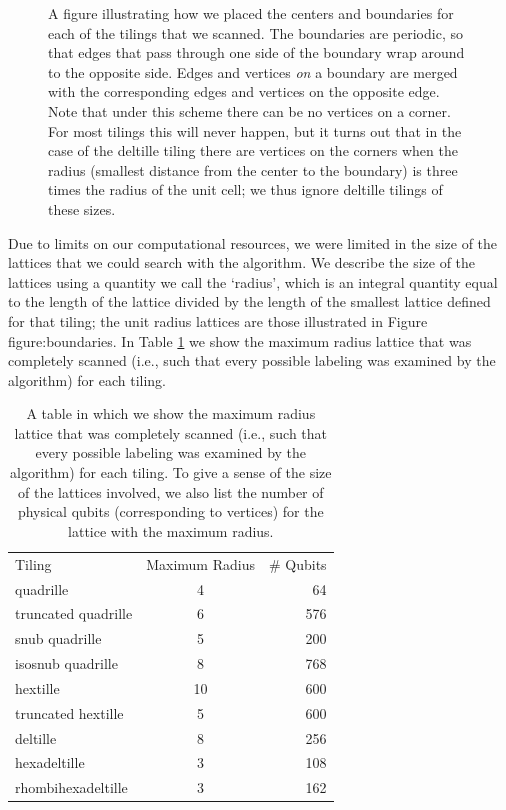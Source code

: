 \documentclass[12pt]{amsbook}
\theoremstyle{plain}
\theoremstyle{definition}
\theoremstyle{remark}
\begin{document}
\begin{figure}
\caption{
\label{figure:boundaries}
A figure illustrating how we placed the centers and boundaries for each of the tilings that we scanned.  The boundaries are periodic, so that edges that pass through one side of the boundary wrap around to the opposite side.  Edges and vertices \emph{on} a boundary are merged with the corresponding edges and vertices on the opposite edge.
Note that under this scheme there can be no vertices on a corner.  For most tilings this will never happen, but it turns out that in the case of the deltille tiling there are vertices on the corners when the radius (smallest distance from the center to the boundary) is three times the radius of the unit cell;  we thus ignore deltille tilings of these sizes.
}
\end{figure}

Due to limits on our computational resources, we were limited in the size of the lattices that we could search with the algorithm.  We describe the size of the lattices using a quantity we call the `radius', which is an integral quantity equal to the length of the lattice divided by the length of the smallest lattice defined for that tiling;  the unit radius lattices are those illustrated in Figure {figure:boundaries}.  In Table \ref{table:maximum-radius-scanned} we show the maximum radius lattice that was completely scanned (i.e., such that every possible labeling was examined by the algorithm) for each tiling.

\begin{table}
\begin{tabular}{lcr}
Tiling & Maximum Radius & \# Qubits\\
quadrille & 4 & 64\\
truncated quadrille & 6 & 576\\
snub quadrille & 5 & 200\\
isosnub quadrille & 8 & 768\\
hextille & 10 & 600\\
truncated hextille & 5 & 600\\
deltille & 8 & 256\\
hexadeltille & 3 & 108\\
rhombihexadeltille & 3 & 162\\
\end{tabular}
\caption[Lattice sizes scanned for each tiling]{
\label{table:maximum-radius-scanned}
A table in which we show the maximum radius lattice that was completely scanned (i.e., such that every possible labeling was examined by the algorithm) for each tiling.  To give a sense of the size of the lattices involved, we also list the number of physical qubits (corresponding to vertices) for the lattice with the maximum radius.
}
\end{table}
\end{document}
